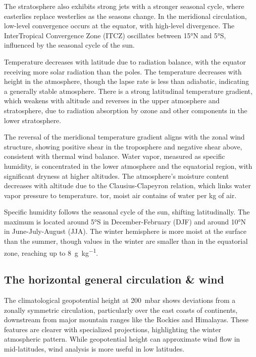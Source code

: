 The stratosphere also exhibits strong jets with a stronger seasonal cycle, where easterlies replace westerlies as the seasons change. In the meridional circulation, low-level convergence occurs at the equator, with high-level divergence. The InterTropical Convergence Zone (ITCZ) oscillates between \ang{15}N and \ang{5}S, influenced by the seasonal cycle of the sun.

Temperature decreases with latitude due to radiation balance, with the equator receiving more solar radiation than the poles. The temperature decreases with height in the atmosphere, though the lapse rate is less than adiabatic, indicating a generally stable atmosphere. There is a strong latitudinal temperature gradient, which weakens with altitude and reverses in the upper atmosphere and stratosphere, due to radiation absorption by ozone and other components in the lower stratosphere.

The reversal of the meridional temperature gradient aligns with the zonal wind structure, showing positive shear in the troposphere and negative shear above, consistent with thermal wind balance. Water vapor, measured as specific humidity, is concentrated in the lower atmosphere and the equatorial region, with significant dryness at higher altitudes. The atmosphere's moisture content decreases with altitude due to the Clausius-Clapeyron relation, which links water vapor pressure to temperature.
tor, moist air contains  of water per \unit{\kilo\gram} of air.

Specific humidity follows the seasonal cycle of the sun, shifting latitudinally. The maximum is located around \ang{5}S in December-February (DJF) and around \ang{10}N in June-July-August (JJA).
The winter hemisphere is more moist at the surface than the summer, though values in the winter are smaller than in the equatorial zone, reaching up to \qty{8}{\gram \per \kg}.


\subsection{The horizontal general circulation \& wind }

The climatological geopotential height at \qty{200}{\milli \bar} shows deviations from a zonally symmetric circulation, particularly over the east coasts of continents, downstream from major mountain ranges like the Rockies and Himalayas. These features are clearer with specialized projections, highlighting the winter atmospheric pattern. While geopotential height can approximate wind flow in mid-latitudes, wind analysis is more useful in low latitudes.

